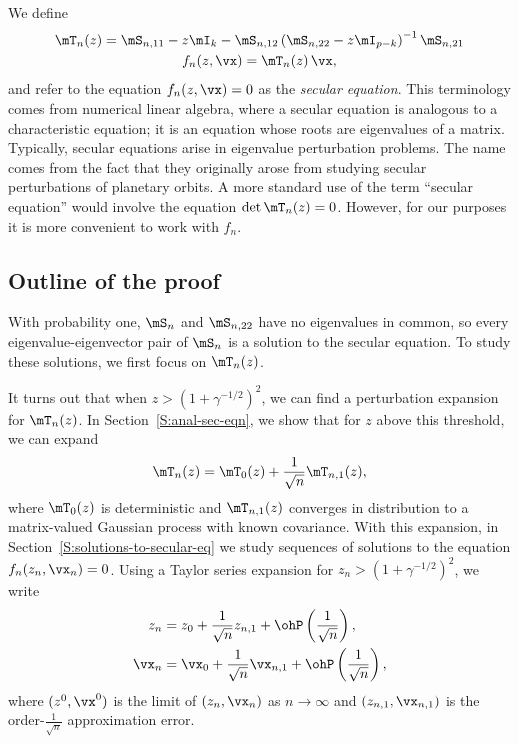 We define
\begin{gather}
    \mT_n(z)
        =
            \mS_{n,11}
            -
            z
            \mI_k
            -
            \mS_{n,12}
            \left(
                \mS_{n,22}
                -
                z
                \mI_{p-k}
            \right)^{-1}
            \mS_{n,21}
            \label{E:secular-T} \\
    f_n ( z, \vx )
        =
            \mT_n(z) \,
            \vx, \label{E:secular-f}
\end{gather}
and refer to the equation $f_n(z, \vx) = 0$ as the \emph{secular equation}. 
This terminology comes from numerical linear algebra, where a secular equation is analogous to a characteristic equation; it is an equation whose
roots are eigenvalues of a matrix.   Typically, secular equations arise in eigenvalue perturbation problems.  The name comes from the fact that they originally arose from studying secular perturbations of planetary orbits.  A more standard use of the term ``secular equation'' would involve the equation $\det \mT_n(z) = 0$.  However, for our purposes it is more convenient to work with $f_n$.

\subsection{Outline of the proof}

With probability one, $\mS_n$ and $\mS_{n,22}$ have no eigenvalues in common, so every eigenvalue-eigenvector pair of $\mS_n$ is a solution to the secular equation.  To study these solutions, we first focus on $\mT_n(z)$.  

It turns out that when $z > (1 + \gamma^{-1/2})^2$, we can find a perturbation expansion for $\mT_n(z)$. In Section~\ref{S:anal-sec-eqn}, we show that for $z$ above this threshold, we can expand
\[
    \mT_n(z)
        =
            \mT_0(z)
            +
            \frac{1}{\sqrt{n}}
            \mT_{n,1}(z),
\]
where $\mT_0(z)$ is deterministic and $\mT_{n,1}(z)$ converges in distribution
to a matrix-valued Gaussian process with known covariance.  With this expansion, in Section~\ref{S:solutions-to-secular-eq} we study sequences of solutions to the equation $f_n(z_n, \vx_n) = 0$.  Using a Taylor series expansion for $z_n > (1 + \gamma^{-1/2})^2$, we write
\begin{align*}
    z_n
        &= 
            z_0 
            + 
            \frac{1}{\sqrt{n}}
            z_{n,1} 
            + 
            \ohP\left( \frac{1}{\sqrt{n}} \right), \\
    \vx_n
        &=
            \vx_0
            +
            \frac{1}{\sqrt{n}}
            \vx_{n,1}
            + 
            \ohP\left( \frac{1}{\sqrt{n}} \right),
\end{align*}
where $(z^0, \vx^0)$ is the limit of $(z_n, \vx_n)$ as $n\to \infty$ and
$(z_{n,1}, \vx_{n,1})$ is the order-$\frac{1}{\sqrt{n}}$ approximation error.

